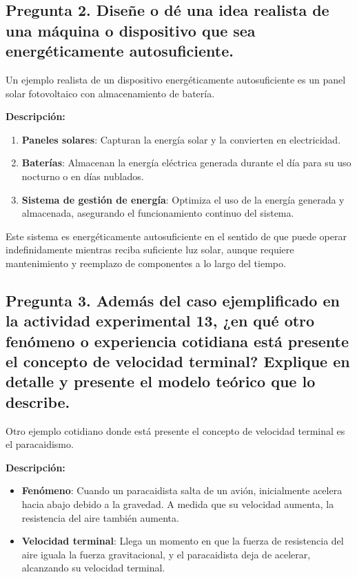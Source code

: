 \documentclass{article}
\begin{document}
\subsection*{Pregunta 2. Diseñe o dé una idea realista de una máquina o dispositivo que sea energéticamente autosuficiente.}

Un ejemplo realista de un dispositivo energéticamente autosuficiente es un panel solar fotovoltaico con almacenamiento de batería.

\textbf{Descripción:}

\begin{enumerate}
    \item \textbf{Paneles solares}: Capturan la energía solar y la convierten en electricidad.
    \item \textbf{Baterías}: Almacenan la energía eléctrica generada durante el día para su uso nocturno o en días nublados.
    \item \textbf{Sistema de gestión de energía}: Optimiza el uso de la energía generada y almacenada, asegurando el funcionamiento continuo del sistema.
\end{enumerate}

Este sistema es energéticamente autosuficiente en el sentido de que puede operar indefinidamente mientras reciba suficiente luz solar, aunque requiere mantenimiento y reemplazo de componentes a lo largo del tiempo.

\subsection*{Pregunta 3. Además del caso ejemplificado en la actividad experimental 13, ¿en qué otro fenómeno o experiencia cotidiana está presente el concepto de velocidad terminal? Explique en detalle y presente el modelo teórico que lo describe.}

Otro ejemplo cotidiano donde está presente el concepto de velocidad terminal es el paracaidismo.

\textbf{Descripción:}

\begin{itemize}
    \item \textbf{Fenómeno}: Cuando un paracaidista salta de un avión, inicialmente acelera hacia abajo debido a la gravedad. A medida que su velocidad aumenta, la resistencia del aire también aumenta.
    \item \textbf{Velocidad terminal}: Llega un momento en que la fuerza de resistencia del aire iguala la fuerza gravitacional, y el paracaidista deja de acelerar, alcanzando su velocidad terminal.
\end{itemize}
\end{document}
